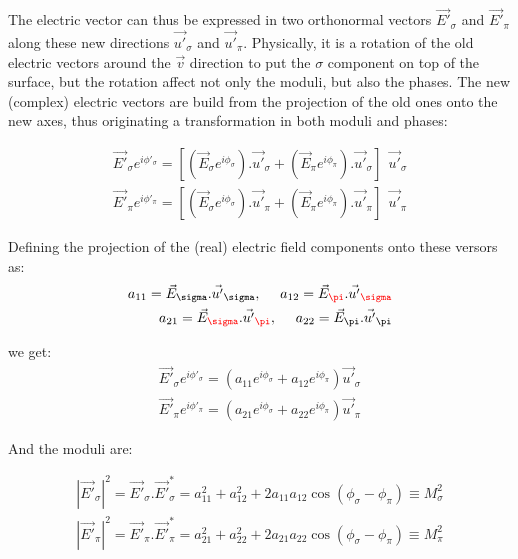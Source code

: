 \documentclass{iucr}
\newcommand{\inred}[1]{{\color{red}#1}}
\begin{document}





The electric vector can thus be expressed in two orthonormal vectors $\vec{E'}_\sigma$ and $\vec{E'}_\pi$ along these 
new directions $\vec{u'}_\sigma$ and $\vec{u'}_\pi$. Physically, it is a rotation of the old electric vectors around
the $\vec{v}$ direction to put the $\sigma$ component on top of the surface, but the rotation affect not only the 
moduli, but also the phases. The new (complex) electric vectors are build from the projection of the old ones onto the
new axes, thus originating a transformation in both moduli and phases:

\begin{eqnarray}
\vec{E'}_\sigma e^{i \phi'_\sigma} = [(\vec{E}_\sigma e^{i \phi_\sigma}).\vec{u'}_\sigma + (\vec{E}_\pi e^{i \phi_\pi}).\vec{u'}_\sigma ] 
  ~~\vec{u'}_\sigma  \\ 
\vec{E'}_\pi e^{i \phi'_\pi} = [(\vec{E}_\sigma e^{i \phi_\sigma}).\vec{u'}_\pi + (\vec{E}_\pi e^{i \phi_\pi}).\vec{u'}_\pi ] 
  ~~\vec{u'}_\pi 
\end{eqnarray}


Defining the projection of the (real) electric field components onto these versors as: 
\begin{eqnarray}
a_{11} = \vec{E}_\sigma . \vec{u'}_\sigma, ~~~~ 
a_{12} = \vec{E}_\inred{\pi} . \vec{u'}_\inred{\sigma} \nonumber \\
a_{21} = \vec{E}_\inred{\sigma} . \vec{u'}_\inred{\pi}, ~~~~
a_{22} = \vec{E}_\pi . \vec{u'}_\pi 
\end{eqnarray}

we get:
\begin{eqnarray}
\label{withphases}
\vec{E'}_\sigma e^{i \phi'_\sigma} = (a_{11} e^{i \phi_\sigma} + a_{12} e^{i \phi_\pi}) \vec{u'}_\sigma \nonumber \\ 
\vec{E'}_\pi e^{i \phi'_\pi} =    (a_{21} e^{i \phi_\sigma} + a_{22} e^{i \phi_\pi}) \vec{u'}_\pi
\end{eqnarray}

And the moduli are: 

\begin{eqnarray}
|\vec{E'}_\sigma|^2 = \vec{E'}_\sigma . \vec{E'}_\sigma^*  = 
a_{11}^2 + a_{12}^2 + 2 a_{11} a_{12} \cos(\phi_\sigma-\phi_\pi) \equiv
M_\sigma^2 \nonumber \\ 
|\vec{E'}_\pi|^2    = \vec{E'}_\pi    . \vec{E'}_\pi^*     = 
a_{21}^2 + a_{22}^2 + 2 a_{21} a_{22} \cos(\phi_\sigma-\phi_\pi) \equiv
M_\pi^2
\end{eqnarray}
\end{document}
